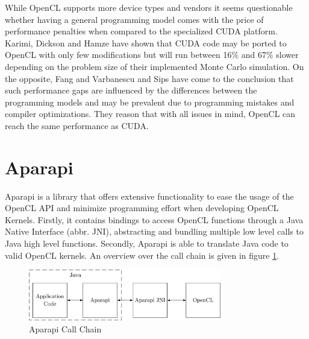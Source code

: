 While OpenCL supports more device types and vendors it seems questionable whether having a general programming model comes with the price of performance penalties when compared to the specialized CUDA platform. Karimi, Dickson and Hamze have shown that CUDA code may be ported to OpenCL with only few modifications but will run between 16\% and 67\% slower depending on the problem size of their implemented Monte Carlo simulation\cite{performance_comparison}. On the opposite, Fang and Varbanescu and Sips have come to the conclusion that such performance gaps are influenced by the differences between the programming models and may be prevalent due to programming mistakes and compiler optimizations\cite{comprehensive_performance_comparison}. They reason that with all issues in mind, OpenCL can reach the same performance as CUDA.

\section{Aparapi}
\label{aparapi}
Aparapi is a library that offers extensive functionality to ease the usage of the OpenCL API and minimize programming effort when developing OpenCL Kernels. Firstly, it contains bindings to access OpenCL functions through a Java Native Interface (abbr. JNI), abstracting and bundling multiple low level calls to Java high level functions. Secondly, Aparapi is able to translate Java code to valid OpenCL kernels. An overview over the call chain is given in figure \ref{img:aparapi_call_chain}.

\begin{figure}[!htb]	
	\includegraphics[width=0.75\textwidth]{drawings/aparapi_call_chain.pdf}
	\centering
	\caption{Aparapi Call Chain}
	\label{img:aparapi_call_chain}
\end{figure}

